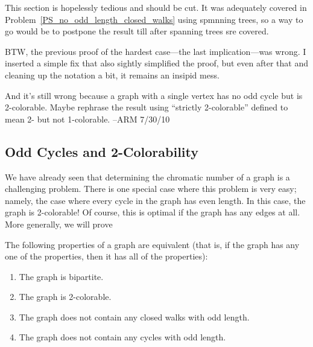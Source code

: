 \begin{editingnotes}

\begin{staffnotes} This section is hopelessly tedious and should be cut.
It was adequately covered in
Problem~\ref{PS_no_odd_length_closed_walks} using spmnning trees, so a
way to go would be to postpone the result till after spanning trees
sre covered.

BTW, the previous proof of the hardest case---the last implication---was
wrong.  I inserted a simple fix that also sightly simplified the proof, but
even after that and cleaning up the notation a bit, it remains an
insipid mess.

And it's still wrong because a graph with a single vertex has no odd
cycle but is 2-colorable.  Maybe rephrase the result using ``strictly
2-colorable'' defined to mean 2- but not 1-colorable.
 --ARM 7/30/10
\end{staffnotes}

\subsection*{Odd Cycles and 2-Colorability}

We have already seen that determining the chromatic number of a graph
is a challenging problem.  There is one special case where this
problem is very easy; namely, the case where every cycle in the graph
has even length.  In this case, the graph is 2-colorable!  Of course,
this is optimal if the graph has any edges at all.  More generally, we
will prove

\begin{theorem}\label{thm:XY}
The following properties of a graph are equivalent (that is, if the
graph has any one of the properties, then it has all of the
properties):
\begin{enumerate}

\item\label{thm:XY:i}
The graph is bipartite.

\item\label{thm:XY:ii}
The graph is 2-colorable.

\item\label{thm:XY:iii}
The graph does not contain any closed walks with odd length.

\item\label{thm:XY:iv}
The graph does not contain any cycles with odd length.

\end{enumerate}
\end{theorem}


\end{editingnotes}
